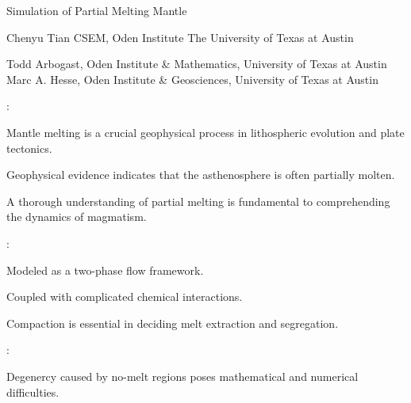 \documentclass[usenames,dvipsnames,letterpaper,landscape,final]{slides}
\begin{document}

\begin{myslide}
\headingline
		  {\bf\Large\begin{center}
					 Simulation of Partial Melting Mantle
		  \end{center}}

\vfill

\begin{center}{\obeylines
Chenyu Tian
\bigskip
	  {CSEM, Oden Institute}
The University of Texas at Austin}
\end{center}

\vfill

{\tiny\begin{center}
					 Todd Arbogast, Oden Institute \& Mathematics, University of Texas at Austin\\
Marc A. Hesse, Oden Institute \& Geosciences, University of Texas at Austin\\
		  \end{center}}

		  \vspace*{40pt}

\end{myslide}


\begin{myslide}

:
\begin{nlist}
\item Mantle melting is a crucial geophysical process in lithospheric evolution and plate tectonics.
\item Geophysical evidence indicates that the asthenosphere is often partially molten.
\item A thorough understanding of partial melting is fundamental to comprehending the dynamics of 
magmatism. 
\end{nlist}

\vspace{20pt}

:
		  \begin{nlist}
		  \item Modeled as a two-phase flow framework.
		  \item Coupled with complicated chemical interactions.
		  \item Compaction is essential in deciding melt extraction and segregation.
		  \end{nlist}

\vspace{20pt}

		  {}:
\begin{nlist}
\item Degenercy caused by no-melt regions poses mathematical and numerical difficulties.  
\end{nlist}

\end{myslide}
\end{document}
